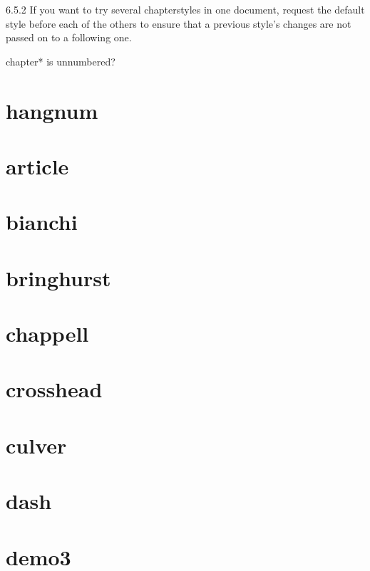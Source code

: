 \documentclass[a4paper, 12pt]{memoir}
\begin{document}
6.5.2
If you want to try several chapterstyles in one document, request the default style
before each of the others to ensure that a previous style’s changes are not passed on to a
following one.

chapter* is unnumbered?

\chapter{ hangnum } 

\chapter{ article } 

\chapter{bianchi} 

\chapter{bringhurst} 

 
\chapter{chappell} 

\chapter{crosshead} 

\chapter{culver} 

\chapter{dash} 

\chapter{demo3} 
\end{document}
